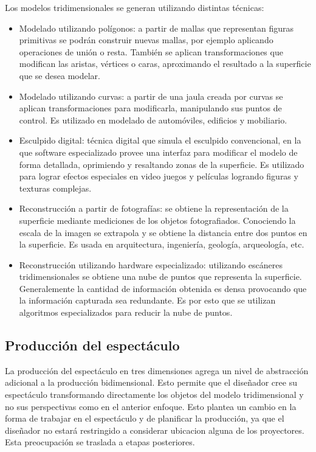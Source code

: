 Los modelos tridimensionales se generan utilizando distintas técnicas:
\begin{itemize}
  \item Modelado utilizando polígonos: a partir de mallas que representan figuras primitivas se podrán construir nuevas mallas, por ejemplo aplicando operaciones de unión o resta.
  También se aplican transformaciones que modifican las aristas, vértices o caras, aproximando el resultado a la superficie que se desea modelar.
  \item  Modelado utilizando curvas: a partir de una jaula creada por curvas se aplican transformaciones para modificarla, manipulando sus puntos de control. Es utilizado en modelado de automóviles, edificios y mobiliario.
  \item Esculpido digital: técnica digital que simula el esculpido convencional, en la que software especializado provee una interfaz para modificar el modelo de forma detallada, oprimiendo y resaltando zonas de la superficie. Es utilizado para lograr efectos especiales en video juegos y películas logrando figuras y texturas complejas.
  \item Reconstrucción a partir de fotografías: se obtiene la representación de la superficie mediante mediciones de los objetos fotografiados. Conociendo la escala de la imagen se extrapola y se obtiene la distancia entre dos puntos en la superficie. Es usada en arquitectura, ingeniería, geología, arqueología, etc.
  \item Reconstrucción utilizando hardware especializado: utilizando escáneres tridimensionales se obtiene una nube de puntos que representa la superficie. Generalemente la cantidad de información obtenida es densa provocando que la información capturada sea redundante. Es por esto que se utilizan algoritmos especializados para reducir la nube de puntos.

\end{itemize}
\subsection{Producción del espectáculo}
La producción del espectáculo en tres dimensiones agrega un nivel de abstracción adicional a la producción bidimensional. Esto permite que el diseñador cree su espectáculo transformando directamente los objetos del modelo tridimensional y no sus perspectivas como en el anterior enfoque.
Esto plantea un cambio en la forma de trabajar en el espectáculo y de planificar la producción, ya que el diseñador no estará restringido a considerar ubicacion alguna de los proyectores. Esta preocupación se traslada a etapas posteriores.

